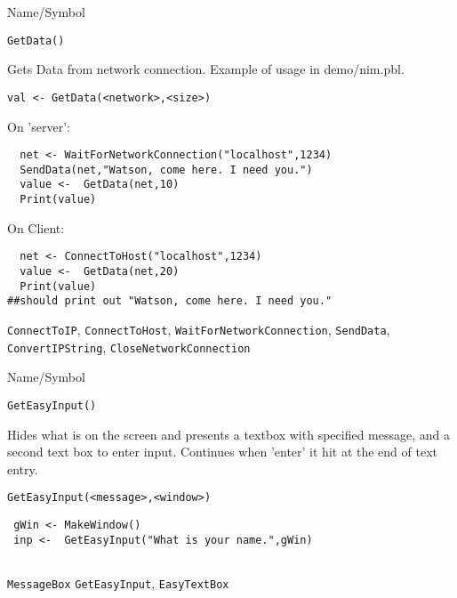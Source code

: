 \begin{desc}{Name/Symbol}
\item[Name/Symbol]	\verb+GetData()+

\item[Description]	Gets Data from network connection.  Example of
  usage in demo/nim.pbl.

\item[Usage]
\begin{verbatim}
val <- GetData(<network>,<size>)
\end{verbatim}

\item[Example]	

On 'server':
\begin{verbatim}
  net <- WaitForNetworkConnection("localhost",1234)
  SendData(net,"Watson, come here. I need you.")
  value <-  GetData(net,10)
  Print(value)

\end{verbatim}
On Client:
\begin{verbatim}
  net <- ConnectToHost("localhost",1234)
  value <-  GetData(net,20)
  Print(value)
##should print out "Watson, come here. I need you."
\end{verbatim}
\item[See Also]
  \verb+ConnectToIP+, \verb+ConnectToHost+, \verb+WaitForNetworkConnection+,
   \verb+SendData+, \verb+ConvertIPString+, \verb+CloseNetworkConnection+
\end{desc}

\rl






\begin{desc}{Name/Symbol}
\item[Name/Symbol]	\verb+GetEasyInput()+

\item[Description]	Hides what is on the screen and presents a textbox with
  specified message, and a second text box to enter input.  Continues
  when 'enter' it hit at the end of text entry.

\item[Usage]		
\begin{verbatim}
GetEasyInput(<message>,<window>)
\end{verbatim}

\item[Example]	
\begin{verbatim}
 gWin <- MakeWindow()
 inp <-  GetEasyInput("What is your name.",gWin)


\end{verbatim}

\item[See Also]\verb+MessageBox+	\verb+GetEasyInput+, \verb+EasyTextBox+
\end{desc}


